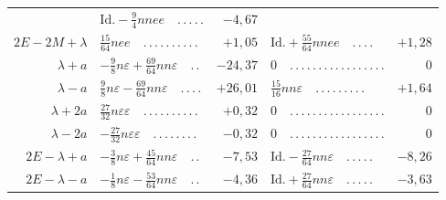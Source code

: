 \begin{landscape}
\begin{longtable}{r|p{7.8cm}r@{\quad}p{4.3cm}r}
&\(\text{Id.}-\tfrac94nnee\quad \mathord{.}\,\mathord{.}\,\mathord{.}\,\mathord{.}\,\mathord{.}\)&\(-4{,}67\)\\
\(2E-2M+\lambda\)&\(\tfrac{15}{64}nee\quad \mathord{.}\,\mathord{.}\,\mathord{.}\,\mathord{.}\,\mathord{.}\,\mathord{.}\,\mathord{.}\,\mathord{.}\,\mathord{.}\,\mathord{.}\)&\(+1{,}05\)
&\(\text{Id.}+\tfrac{55}{64}nnee\quad \mathord{.}\,\mathord{.}\,\mathord{.}\,\mathord{.}\)&\(+1{,}28\)\\
\(\lambda+a\)&\(-\tfrac98n\varepsilon+\tfrac{69}{64}nn\varepsilon\quad \mathord{.}\,\mathord{.}\)&\(-24{,}37\)
&\(0\quad \mathord{.}\,\mathord{.}\,\mathord{.}\,\mathord{.}\,\mathord{.}\,\mathord{.}\,\mathord{.}\,\mathord{.}\,\mathord{.}\,\mathord{.}\,\mathord{.}\,\mathord{.}\,\mathord{.}\,\mathord{.}\,\mathord{.}\,\mathord{.}\,\mathord{.}\)&\(0\)\\
\(\lambda-a\)&\(\tfrac98n\varepsilon-\tfrac{69}{64}nn\varepsilon\quad \mathord{.}\,\mathord{.}\,\mathord{.}\,\mathord{.}\)&\(+26{,}01\)
&\(\tfrac{15}{16}nn\varepsilon\quad \mathord{.}\,\mathord{.}\,\mathord{.}\,\mathord{.}\,\mathord{.}\,\mathord{.}\,\mathord{.}\,\mathord{.}\,\mathord{.}\)&\(+1{,}64\)\\
\(\lambda+2a\)&\(\tfrac{27}{32}n\varepsilon\varepsilon\quad \mathord{.}\,\mathord{.}\,\mathord{.}\,\mathord{.}\,\mathord{.}\,\mathord{.}\,\mathord{.}\,\mathord{.}\,\mathord{.}\,\mathord{.}\)&\(+0{,}32\)
&\(0\quad \mathord{.}\,\mathord{.}\,\mathord{.}\,\mathord{.}\,\mathord{.}\,\mathord{.}\,\mathord{.}\,\mathord{.}\,\mathord{.}\,\mathord{.}\,\mathord{.}\,\mathord{.}\,\mathord{.}\,\mathord{.}\,\mathord{.}\,\mathord{.}\,\mathord{.}\)&\(0\)\\
\(\lambda-2a\)&\(-\tfrac{27}{32}n\varepsilon\varepsilon\quad \mathord{.}\,\mathord{.}\,\mathord{.}\,\mathord{.}\,\mathord{.}\,\mathord{.}\,\mathord{.}\,\mathord{.}\)&\(-0{,}32\)
&\(0\quad \mathord{.}\,\mathord{.}\,\mathord{.}\,\mathord{.}\,\mathord{.}\,\mathord{.}\,\mathord{.}\,\mathord{.}\,\mathord{.}\,\mathord{.}\,\mathord{.}\,\mathord{.}\,\mathord{.}\,\mathord{.}\,\mathord{.}\,\mathord{.}\,\mathord{.}\)&\(0\)\\
\(2E-\lambda+a\)&\(-\tfrac38n\varepsilon+\tfrac{45}{64}nn\varepsilon\quad \mathord{.}\,\mathord{.}\)&\(-7{,}53\)
&\(\text{Id.}-\tfrac{27}{64}nn\varepsilon\quad \mathord{.}\,\mathord{.}\,\mathord{.}\,\mathord{.}\,\mathord{.}\)&\(-8{,}26\)\\
\(2E-\lambda-a\)&\(-\tfrac18n\varepsilon-\tfrac{53}{64}nn\varepsilon\quad \mathord{.}\,\mathord{.}\)&\(-4{,}36\)
&\(\text{Id.}+\tfrac{27}{64}nn\varepsilon\quad \mathord{.}\,\mathord{.}\,\mathord{.}\,\mathord{.}\,\mathord{.}\)&\(-3{,}63\)\\

\end{longtable}
\end{landscape}
